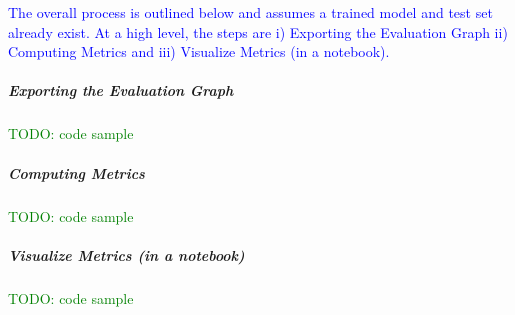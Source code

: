 \textcolor{blue}{The overall process is outlined below and assumes a trained model and test set already exist. At a high level, the steps are i) Exporting the Evaluation Graph ii) Computing Metrics and iii) Visualize Metrics (in a notebook). }

\subparagraph{Exporting the Evaluation Graph}

\textcolor{green}{TODO: code sample}

\subparagraph{Computing Metrics}

\textcolor{green}{TODO: code sample}

\subparagraph{Visualize Metrics (in a notebook)}

\textcolor{green}{TODO: code sample}


